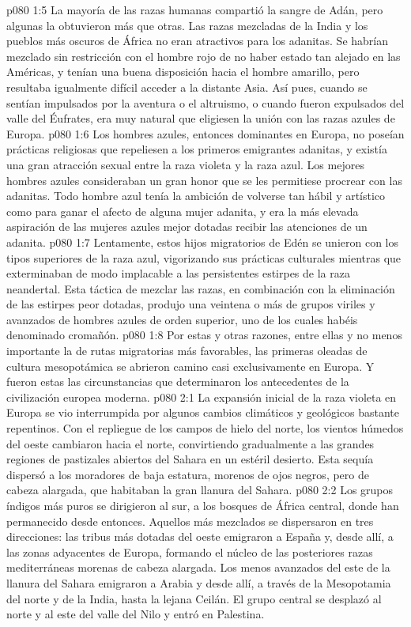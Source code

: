 \vs p080 1:5 La mayoría de las razas humanas compartió la sangre de Adán, pero algunas la obtuvieron más que otras. Las razas mezcladas de la India y los pueblos más oscuros de África no eran atractivos para los adanitas. Se habrían mezclado sin restricción con el hombre rojo de no haber estado tan alejado en las Américas, y tenían una buena disposición hacia el hombre amarillo, pero resultaba igualmente difícil acceder a la distante Asia. Así pues, cuando se sentían impulsados por la aventura o el altruismo, o cuando fueron expulsados del valle del Éufrates, era muy natural que eligiesen la unión con las razas azules de Europa.
\vs p080 1:6 Los hombres azules, entonces dominantes en Europa, no poseían prácticas religiosas que repeliesen a los primeros emigrantes adanitas, y existía una gran atracción sexual entre la raza violeta y la raza azul. Los mejores hombres azules consideraban un gran honor que se les permitiese procrear con las adanitas. Todo hombre azul tenía la ambición de volverse tan hábil y artístico como para ganar el afecto de alguna mujer adanita, y era la más elevada aspiración de las mujeres azules mejor dotadas recibir las atenciones de un adanita.
\vs p080 1:7 Lentamente, estos hijos migratorios de Edén se unieron con los tipos superiores de la raza azul, vigorizando sus prácticas culturales mientras que exterminaban de modo implacable a las persistentes estirpes de la raza neandertal. Esta táctica de mezclar las razas, en combinación con la eliminación de las estirpes peor dotadas, produjo una veintena o más de grupos viriles y avanzados de hombres azules de orden superior, uno de los cuales habéis denominado cromañón.
\vs p080 1:8 Por estas y otras razones, entre ellas y no menos importante la de rutas migratorias más favorables, las primeras oleadas de cultura mesopotámica se abrieron camino casi exclusivamente en Europa. Y fueron estas las circunstancias que determinaron los antecedentes de la civilización europea moderna.
\vs p080 2:1 La expansión inicial de la raza violeta en Europa se vio interrumpida por algunos cambios climáticos y geológicos bastante repentinos. Con el repliegue de los campos de hielo del norte, los vientos húmedos del oeste cambiaron hacia el norte, convirtiendo gradualmente a las grandes regiones de pastizales abiertos del Sahara en un estéril desierto. Esta sequía dispersó a los moradores de baja estatura, morenos de ojos negros, pero de cabeza alargada, que habitaban la gran llanura del Sahara.
\vs p080 2:2 Los grupos índigos más puros se dirigieron al sur, a los bosques de África central, donde han permanecido desde entonces. Aquellos más mezclados se dispersaron en tres direcciones: las tribus más dotadas del oeste emigraron a España y, desde allí, a las zonas adyacentes de Europa, formando el núcleo de las posteriores razas mediterráneas morenas de cabeza alargada. Los menos avanzados del este de la llanura del Sahara emigraron a Arabia y desde allí, a través de la Mesopotamia del norte y de la India, hasta la lejana Ceilán. El grupo central se desplazó al norte y al este del valle del Nilo y entró en Palestina.
